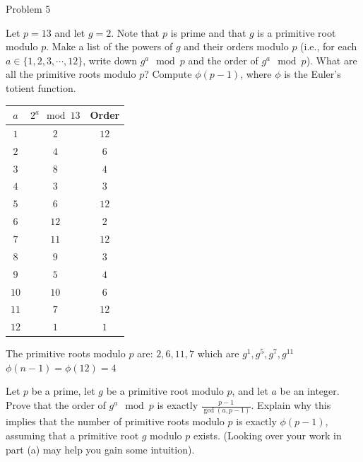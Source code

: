 \documentclass[12pt]{article}
\begin{document}
\clearpage
\problem Problem 5

\subproblem Let $p=13$ and let $g=2$. Note that $p$ is prime and that $g$ is a primitive root modulo $p$. Make a list of the powers of $g$ and their orders modulo $p$ (i.e., for each $a\in\{1,2,3,\cdots,12\}$, write down $g^a \mod{p}$ and the order of $g^a \mod{p}$). What are all the primitive roots modulo $p$? Compute $\phi(p-1)$, where $\phi$ is the Euler’s totient function.

\solution
\begin{tabular}{|c|c|c|}
    \hline
    $a$  & $2^a \mod{13}$ & Order \\
    \hline
    $1$  & $2$            & $12$  \\
    $2$  & $4$            & $6$   \\
    $3$  & $8$            & $4$   \\
    $4$  & $3$            & $3$   \\
    $5$  & $6$            & $12$  \\
    $6$  & $12$           & $2$   \\
    $7$  & $11$           & $12$  \\
    $8$  & $9$            & $3$   \\
    $9$  & $5$            & $4$   \\
    $10$ & $10$           & $6$   \\
    $11$ & $7$            & $12$  \\
    $12$ & $1$            & $1$   \\
    \hline
\end{tabular}

\noindent
The primitive roots modulo $p$ are:
$2,6,11,7$ which are $g^1,g^5,g^7,g^{11}$
$\phi(n-1)=\phi(12)=4$

\clearpage
\subproblem Let $p$ be a prime, let $g$ be a primitive root modulo $p$, and let $a$ be an integer. Prove that the order of $g^a\mod{p}$ is exactly $\frac{p-1}{\gcd(a,p-1)}$. Explain why this implies that the number of primitive roots modulo $p$ is exactly $\phi(p-1)$, assuming that a primitive root $g$ modulo $p$ exists. (Looking over your work in part (a) may help you gain some intuition).
\end{document}
